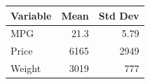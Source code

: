 \begin{tabular}{lrr}
\toprule
Variable & Mean & Std Dev \\
\midrule
MPG &  21.3 &  5.79 \\
Price &    6165 &    2949 \\
Weight &   3019 &    777 \\
\bottomrule
\end{tabular}
